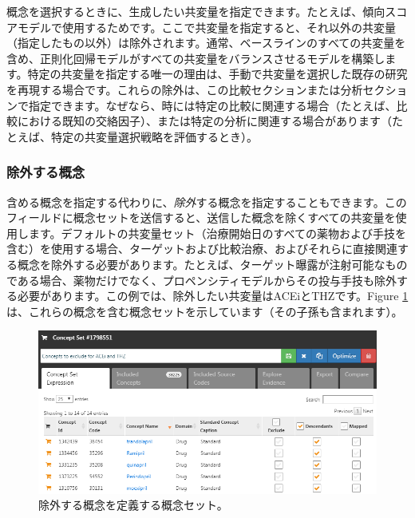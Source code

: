 \documentclass[
  11pt]{book}
\theoremstyle{definition}
\theoremstyle{definition}
\theoremstyle{definition}
\theoremstyle{definition}
\theoremstyle{remark}
\begin{document}
概念を選択するときに、生成したい共変量を指定できます。たとえば、傾向スコアモデルで使用するためです。ここで共変量を指定すると、それ以外の共変量（指定したもの以外）は除外されます。通常、ベースラインのすべての共変量を含め、正則化回帰モデルがすべての共変量をバランスさせるモデルを構築します。特定の共変量を指定する唯一の理由は、手動で共変量を選択した既存の研究を再現する場合です。これらの除外は、この比較セクションまたは分析セクションで指定できます。なぜなら、時には特定の比較に関連する場合（たとえば、比較における既知の交絡因子）、または特定の分析に関連する場合があります（たとえば、特定の共変量選択戦略を評価するとき）。

\subsubsection*{除外する概念}\label{ux9664ux5916ux3059ux308bux6982ux5ff5}

含める概念を指定する代わりに、\emph{除外}する概念を指定することもできます。このフィールドに概念セットを送信すると、送信した概念を除くすべての共変量を使用します。デフォルトの共変量セット（治療開始日のすべての薬物および手技を含む）を使用する場合、ターゲットおよび比較治療、およびそれらに直接関連する概念を除外する必要があります。たとえば、ターゲット曝露が注射可能なものである場合、薬物だけでなく、プロペンシティモデルからその投与手技も除外する必要があります。この例では、除外したい共変量はACEiとTHZです。Figure \ref{fig:covsToExclude}は、これらの概念を含む概念セットを示しています（その子孫も含まれます）。

\begin{figure}

{\centering \includegraphics[width=1\linewidth]{images/PopulationLevelEstimation/covsToExclude} 

}

\caption{除外する概念を定義する概念セット。}\label{fig:covsToExclude}
\end{figure}
\end{document}
